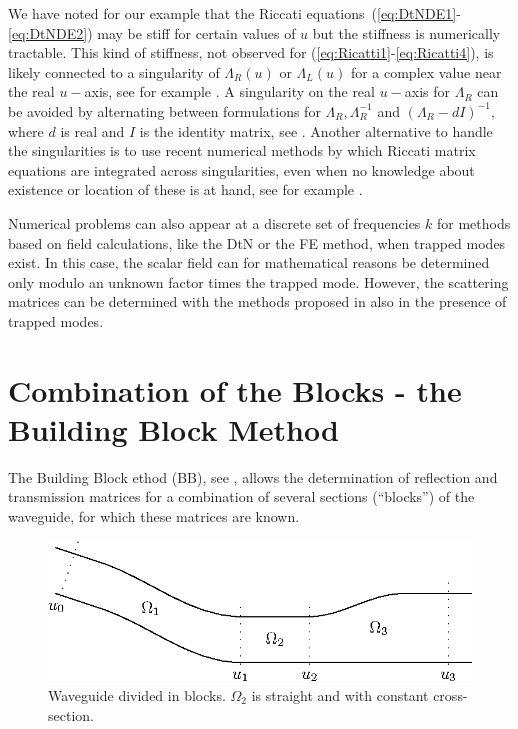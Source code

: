 \documentclass[numreferences]{kluwer}
\renewcommand{\Lambda}{\varLambda}
\renewcommand{\Lambda}{\varLambda}
\begin{document}
We have noted for our example that the Riccati equations~(\ref{eq:DtNDE1}-\ref{eq:DtNDE2}) may  be stiff for certain values of $u$ but the stiffness is numerically tractable. This kind of stiffness,  not observed for (\ref{eq:Ricatti1}-\ref{eq:Ricatti4}), is likely connected to a singularity of $\Lambda_R(u)$ or $\Lambda_L(u)$  for a complex value near the real $u-$axis, see for example
\cite{Fishman:1998}. A singularity on the real $u-$axis for $\Lambda_R$ can be avoided by alternating between formulations for $\Lambda_R,\Lambda_R^{-1}$ and $(\Lambda_R-dI)^{-1}$, where $d$ is real and $I$ is the identity matrix, see \cite{lu+mclaughlin:2000}. Another alternative to handle the singularities is to use recent numerical methods by which Riccati
matrix equations are integrated across singularities, even when no knowledge about existence or location of these is at hand, see for example \cite{Li-Kahan:2012}. 

Numerical problems can also appear at a discrete set of frequencies $k$ for methods based on field calculations, like the DtN or the FE method, when trapped modes exist. In this case, the scalar field can for mathematical reasons be determined only modulo an unknown factor times the trapped mode. However, the scattering matrices can be determined with the methods proposed in \cite{Nilsson:2002} also in the presence of trapped modes.


\section{Combination of the Blocks - the Building
 Block Method}
\label{sec:comb-blocks-build}

The Building Block ethod (BB), see \cite{nilssonbrander1981b}, allows
the determination of reflection and transmission matrices for a
combination of several sections (``blocks'') of the waveguide, for
which these matrices are known.

\begin{figure}[htb]
  \centering
  \includegraphics[width=\textwidth]{BBMwg-1}
  \caption{Waveguide divided in blocks. $\Omega_2$ is straight and
    with constant cross-section.}
  \label{fig:wg4}
\end{figure}
\end{document}
